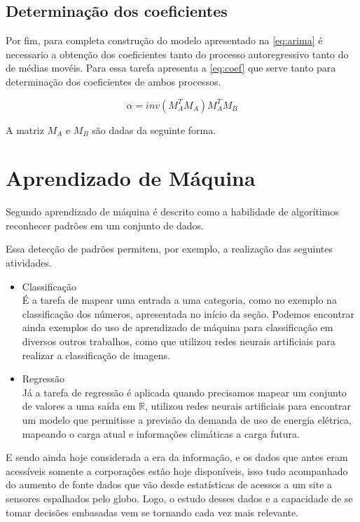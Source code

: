 \documentclass[
    12pt,
    oneside,
    a4paper,
    english,
    brazil
]{abntex2}
\begin{document}
\subsection{Determinação dos coeficientes}
Por fim, para completa construção do modelo apresentado na \autoref{eq:arima} é
necessario a obtenção dos coeficientes tanto do processo autoregressivo tanto
do de médias movéis. Para essa tarefa  apresenta a
\autoref{eq:coef} que serve tanto para determinação dos coeficientes de ambos
processos.

\begin{equation}
    \label{eq:coef}
    \alpha = inv(M_A^T M_A) M_A^T M_B
\end{equation}

A matriz $M_A$ e $M_B$ são dadas da seguinte forma.

\section{Aprendizado de Máquina}

Segundo  aprendizado de máquina é descrito como a
habilidade de algorítimos reconhecer padrões em um conjunto de dados.

Essa detecção de padrões permitem, por exemplo, a realização das seguintes
atividades.
\begin{itemize}
    \item Classificação\\
        É a tarefa de mapear uma entrada a uma categoria, como no exemplo na classificação dos números, apresentada no início da seção. Podemos
        encontrar ainda exemplos do uso de aprendizado de máquina para
        classificação em diversos outros trabalhos, como
         que utilizou redes neurais artificiais
        para realizar a classificação de imagens.
    \item Regressão\\
        Já a tarefa de regressão é aplicada quando precisamos mapear um
        conjunto de valores a uma saída em $ \mathbb{R} $,
         utilizou redes neurais artificiais para
        encontrar um modelo que permitisse a previsão da demanda de uso de
        energia elétrica, mapeando o carga atual e informações climáticas a
        carga futura.
\end{itemize}

E sendo ainda hoje considerada a era da informação, e os dados que antes eram
acessíveis somente a corporações estão hoje disponíveis, isso tudo acompanhado
do aumento de fonte dados que vão desde estatísticas de acessos a um site a
sensores espalhados pelo globo. Logo, o estudo desses dados e a capacidade de
se tomar decisões embasadas vem se tornando cada vez mais
relevante.\cite{ethem}
\end{document}
